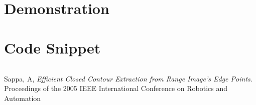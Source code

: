 \documentclass{InsightArticle}
\begin{document}

\section{Demonstration}
\label{sec:Demonstration}


\section{Code Snippet}

\begin{verbatim}

\end{verbatim}


\begin{thebibliography}{9}

	  Sappa, A,
	  \emph{Efficient Closed Contour Extraction from Range Image's Edge Points}.
	  Proceedings of the 2005 IEEE International Conference on Robotics and Automation

\end{thebibliography}
\end{document}
